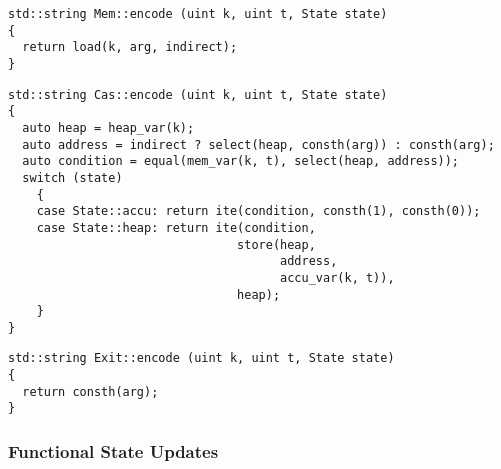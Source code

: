 \begin{lstlisting}[style=c++,aboveskip=-\encodeskip,belowskip=\encodeskip]
std::string Mem::encode (uint k, uint t, State state)
{
  return load(k, arg, indirect);
}
\end{lstlisting}


\begin{lstlisting}[style=c++,aboveskip=-\encodeskip,belowskip=\encodeskip]
std::string Cas::encode (uint k, uint t, State state)
{
  auto heap = heap_var(k);
  auto address = indirect ? select(heap, consth(arg)) : consth(arg);
  auto condition = equal(mem_var(k, t), select(heap, address));
  switch (state)
    {
    case State::accu: return ite(condition, consth(1), consth(0));
    case State::heap: return ite(condition,
                                store(heap,
                                      address,
                                      accu_var(k, t)),
                                heap);
    }
}
\end{lstlisting}



\begin{lstlisting}[style=c++,aboveskip=-\encodeskip,belowskip=\encodeskip]
std::string Exit::encode (uint k, uint t, State state)
{
  return consth(arg);
}
\end{lstlisting}

\subsubsection{Functional State Updates}


